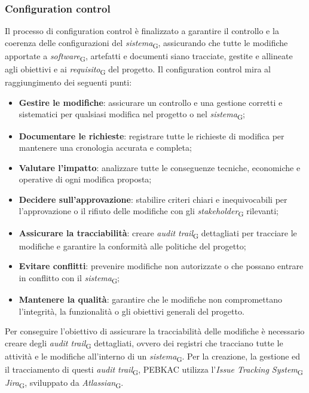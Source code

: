 \subsubsection{Configuration control}
Il processo di configuration control è finalizzato a garantire il controllo e la coerenza delle configurazioni del \textit{sistema}\textsubscript{G}, assicurando che tutte le modifiche apportate a \textit{software}\textsubscript{G}, artefatti e documenti siano tracciate, gestite e allineate agli obiettivi e ai \textit{requisito}\textsubscript{G} del progetto.
Il configuration control mira al raggiungimento dei seguenti punti:
\begin{itemize}
    \item \textbf{Gestire le modifiche}: assicurare un controllo e una gestione corretti e sistematici per qualsiasi modifica nel progetto o nel \textit{sistema}\textsubscript{G};
    \item \textbf{Documentare le richieste}: registrare tutte le richieste di modifica per mantenere una cronologia accurata e completa;
    \item \textbf{Valutare l'impatto}: analizzare tutte le conseguenze tecniche, economiche e operative di ogni modifica proposta;
    \item \textbf{Decidere sull'approvazione}: stabilire criteri chiari e inequivocabili per l'approvazione o il rifiuto delle modifiche con gli \textit{stakeholder}\textsubscript{G} rilevanti;
    \item \textbf{Assicurare la tracciabilità}: creare \textit{audit trail}\textsubscript{G} dettagliati per tracciare le modifiche e garantire la conformità alle politiche del progetto;
    \item \textbf{Evitare conflitti}: prevenire modifiche non autorizzate o che possano entrare in conflitto con il \textit{sistema}\textsubscript{G};
    \item \textbf{Mantenere la qualità}: garantire che le modifiche non compromettano l'integrità, la funzionalità o gli obiettivi generali del progetto.
\end{itemize}
Per conseguire l'obiettivo di assicurare la tracciabilità delle modifiche è necessario creare degli \textit{audit trail}\textsubscript{G} dettagliati, ovvero dei registri che tracciano tutte le attività e le modifiche all'interno di un \textit{sistema}\textsubscript{G}. Per la creazione, la gestione ed il tracciamento di questi \textit{audit trail}\textsubscript{G}, PEBKAC utilizza l'\textit{Issue Tracking System}\textsubscript{G} \textit{Jira}\textsubscript{G}, sviluppato da \textit{Atlassian}\textsubscript{G}.

